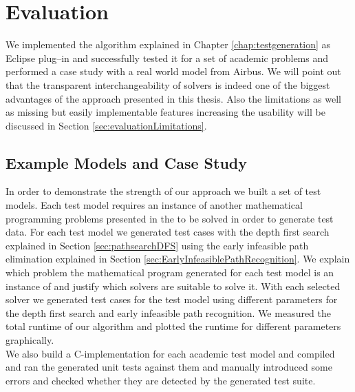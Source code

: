 \chapter{Evaluation}
\label{chap:evaluation}
We implemented the algorithm explained in Chapter \ref{chap:testgeneration} as Eclipse plug--in and successfully tested it for a set of academic problems and performed a case study with a real world model from Airbus. We will point out that the transparent interchangeability of solvers is indeed one of the biggest advantages of the approach presented in this thesis. Also the limitations as well as missing but easily implementable features increasing the usability will be discussed in Section \ref{sec:evaluationLimitations}.\\
\section{Example Models and Case Study}
In order to demonstrate the strength of our approach we built a set of test models. Each test model requires an instance of another mathematical programming problems presented in the  to be solved in order to generate test data. For each test model we generated test cases with the depth first search explained in Section \ref{sec:pathsearchDFS} using the early infeasible path elimination explained in Section \ref{sec:EarlyInfeasiblePathRecognition}. We explain which problem the mathematical program generated for each test model is an instance of and justify which solvers are suitable to solve it. With each selected solver we generated test cases for the test model using different parameters for the depth first search and early infeasible path recognition. We measured the total runtime of our algorithm and plotted the runtime for different parameters graphically.\\
We also build a C-implementation for each academic test model and compiled and ran the generated unit tests against them and manually introduced some errors and checked whether they are detected by the generated test suite.
